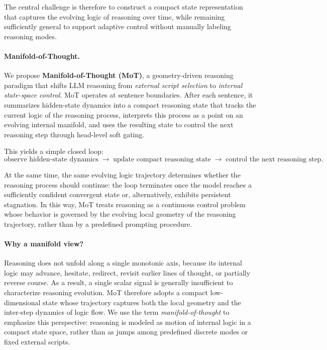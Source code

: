 \documentclass{article}
\begin{document}
The central challenge is therefore to construct a compact state representation that captures the evolving logic of reasoning over time, while remaining sufficiently general to support adaptive control without manually labeling reasoning modes.

\paragraph{Manifold-of-Thought.}
We propose \textbf{Manifold-of-Thought (MoT)}, a geometry-driven reasoning paradigm that shifts LLM reasoning from \emph{external script selection} to \emph{internal state-space control}. MoT operates at sentence boundaries. After each sentence, it summarizes hidden-state dynamics into a compact reasoning state that tracks the current logic of the reasoning process, interprets this process as a point on an evolving internal manifold, and uses the resulting state to control the next reasoning step through head-level soft gating.

This yields a simple closed loop:
\[
\text{observe hidden-state dynamics}
\;\rightarrow\;
\text{update compact reasoning state}
\;\rightarrow\;
\text{control the next reasoning step}.
\]

At the same time, the same evolving logic trajectory determines whether the reasoning process should continue: the loop terminates once the model reaches a sufficiently confident convergent state or, alternatively, exhibits persistent stagnation. In this way, MoT treats reasoning as a continuous control problem whose behavior is governed by the evolving local geometry of the reasoning trajectory, rather than by a predefined prompting procedure.

\paragraph{Why a manifold view?}
Reasoning does not unfold along a single monotonic axis, because its internal logic may advance, hesitate, redirect, revisit earlier lines of thought, or partially reverse course. As a result, a single scalar signal is generally insufficient to characterize reasoning evolution. MoT therefore adopts a compact low-dimensional state whose trajectory captures both the local geometry and the inter-step dynamics of logic flow. We use the term \emph{manifold-of-thought} to emphasize this perspective: reasoning is modeled as motion of internal logic in a compact state space, rather than as jumps among predefined discrete modes or fixed external scripts.
\end{document}
